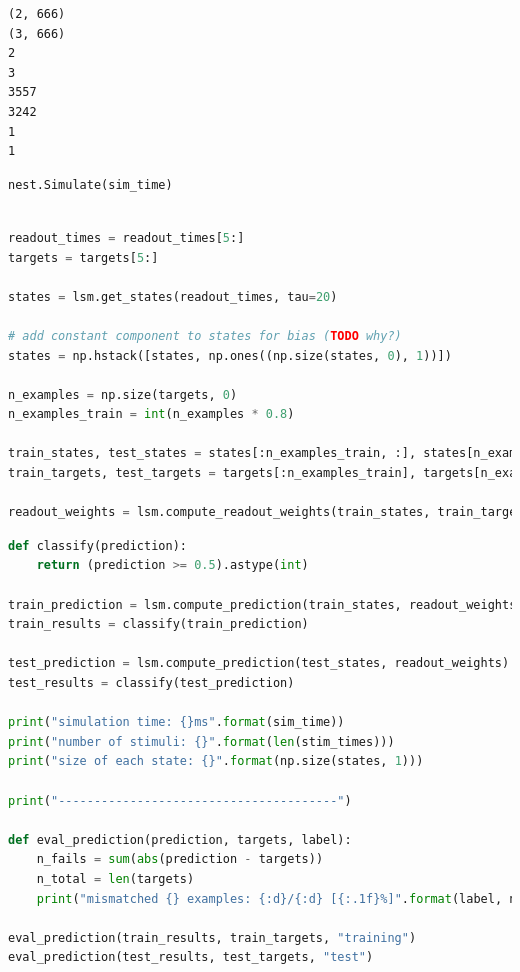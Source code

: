 \begin{lstlisting}
(2, 666)
(3, 666)
2
3
3557
3242
1
1
\end{lstlisting}

\begin{lstlisting}[language=Python]
nest.Simulate(sim_time)
\end{lstlisting}

\begin{lstlisting}[language=Python]

readout_times = readout_times[5:]
targets = targets[5:]

states = lsm.get_states(readout_times, tau=20)

# add constant component to states for bias (TODO why?)
states = np.hstack([states, np.ones((np.size(states, 0), 1))])

n_examples = np.size(targets, 0)
n_examples_train = int(n_examples * 0.8)

train_states, test_states = states[:n_examples_train, :], states[n_examples_train:, :]
train_targets, test_targets = targets[:n_examples_train], targets[n_examples_train:]

readout_weights = lsm.compute_readout_weights(train_states, train_targets, reg_fact=5.0)
\end{lstlisting}

\begin{lstlisting}[language=Python]
def classify(prediction):
    return (prediction >= 0.5).astype(int)

train_prediction = lsm.compute_prediction(train_states, readout_weights)
train_results = classify(train_prediction)

test_prediction = lsm.compute_prediction(test_states, readout_weights)
test_results = classify(test_prediction)

print("simulation time: {}ms".format(sim_time))
print("number of stimuli: {}".format(len(stim_times)))
print("size of each state: {}".format(np.size(states, 1)))

print("---------------------------------------")

def eval_prediction(prediction, targets, label):
    n_fails = sum(abs(prediction - targets))
    n_total = len(targets)
    print("mismatched {} examples: {:d}/{:d} [{:.1f}%]".format(label, n_fails, n_total, n_fails / n_total * 100))

eval_prediction(train_results, train_targets, "training")
eval_prediction(test_results, test_targets, "test")
\end{lstlisting}

